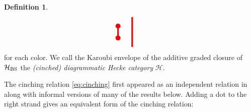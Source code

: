 \documentclass{amsart}
\theoremstyle{plain}
\theoremstyle{definition}
\newtheorem{defn}[thm]{Definition}
\theoremstyle{remark}
\numberwithin{equation}{section}
\newcommand{\defnemph}[1]{\emph{#1}}
\begin{document}
\begin{defn}
\begin{equation}
\begin{minipage}{1.5cm}
\begin{tikzpicture}[scale=1.000]
\draw[red,line width=0.08cm](0.5,0)--++(90:1.5);
\draw[red,line width=0.08cm] (0-0.2 ,0.75)--++(90:0.3) coordinate(hi);
\fill[red] (hi) circle (3.5pt);
\draw[red,line width=0.08cm] (0-0.2 ,0.75)--++(-90:0.3) coordinate(hi);
\fill[red] (hi) circle (3.5pt);
  \end{tikzpicture}
  \end{minipage} \label{eq:cinching}
\end{equation}
for each color.
We call the Karoubi envelope of the additive graded closure of $\mathcal{H}_{\rm BS}$ the \defnemph{(cinched) diagrammatic Hecke category} $\mathcal{H}$.
\end{defn}


The cinching relation \eqref{eq:cinching} first appeared as an independent relation in \cite[(R4)]{bdhn-hsp} along with informal versions of many of the results below. 
Adding a dot to the right strand gives an equivalent form of the cinching relation:
\end{document}
